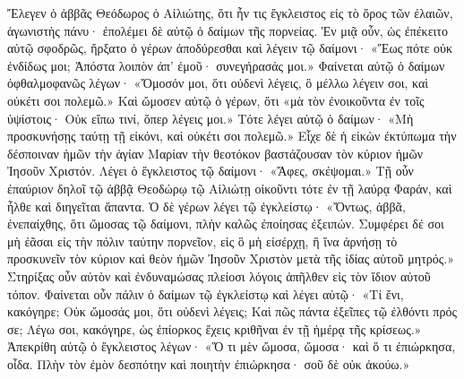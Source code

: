 \documentclass[10pt]{book}
\newcommand{\switchenglish}{\selectlanguage{english} \switchcolumn}
\begin{document}
\begin{paracol}{2}
Ἔλεγεν ὁ ἀββᾶς Θεόδωρος ὁ Αἰλιώτης, ὅτι ἦν τις ἔγκλειστος εἰς τὸ ὄρος τῶν
ἐλαιῶν, ἀγωνιστὴς πάνυ· ἐπολέμει δὲ αὐτῷ ὁ δαίμων τῆς πορνείας. Ἐν μιᾷ οὖν, ὡς
ἐπέκειτο αὐτῷ σφοδρῶς, ἤρξατο ὁ γέρων ἀποδύρεσθαι καὶ λέγειν τῷ δαίμονι· «Ἕως
πότε οὐκ ἐνδίδως μοι; Ἀπόστα λοιπὸν ἀπ’ ἐμοῦ· συνεγήρασάς μοι.» Φαίνεται αὐτῷ
ὁ δαίμων ὀφθαλμοφανῶς λέγων· «Ὄμοσόν μοι, ὅτι οὐδενὶ λέγεις, ὃ μέλλω λέγειν
σοι, καὶ οὐκέτι σοι πολεμῶ.» Καὶ ὤμοσεν αὐτῷ ὁ γέρων, ὅτι «μὰ τὸν ἐνοικοῦντα
ἐν τοῖς ὑψίστοις· Οὐκ εἴπω τινί, ὅπερ λέγεις μοι.» Τότε λέγει αὐτῷ ὁ δαίμων·
«Μὴ προσκυνήσῃς ταύτῃ τῇ εἰκόνι, καὶ οὐκέτι σοι πολεμῶ.» Εἶχε δὲ ἡ εἰκὼν
ἐκτύπωμα τὴν δέσποιναν ἡμῶν τὴν ἁγίαν Μαρίαν τὴν θεοτόκον βαστάζουσαν τὸν
κύριον ἡμῶν Ἰησοῦν Χριστόν. Λέγει ὁ ἔγκλειστος τῷ δαίμονι· «Ἄφες, σκέψομαι.»
Τῇ οὖν ἐπαύριον δηλοῖ τῷ ἀββᾷ Θεοδώρῳ τῷ Αἰλιώτῃ οἰκοῦντι τότε ἐν τῇ λαύρᾳ
Φαράν, καὶ ἦλθε καὶ διηγεῖται ἅπαντα. Ὁ δὲ γέρων λέγει τῷ ἐγκλείστῳ· «Ὄντως,
ἀββᾶ, ἐνεπαίχθης, ὅτι ὤμοσας τῷ δαίμονι, πλὴν καλῶς ἐποίησας ἐξειπών. Συμφέρει
δέ σοι μὴ ἐᾶσαι εἰς τὴν πόλιν ταύτην πορνεῖον, εἰς ὃ μὴ εἰσέρχῃ, ἢ ἵνα ἀρνήσῃ
τὸ προσκυνεῖν τὸν κύριον καὶ θεὸν ἡμῶν Ἰησοῦν Χριστὸν μετὰ τῆς ἰδίας αὐτοῦ
μητρός.» Στηρίξας οὖν αὐτὸν καὶ ἐνδυναμώσας πλείοσι λόγοις ἀπῆλθεν εἰς τὸν
ἴδιον αὐτοῦ τόπον. Φαίνεται οὖν πάλιν ὁ δαίμων τῷ ἐγκλείστῳ καὶ λέγει αὐτῷ·
«Τί ἔνι, κακόγηρε; Οὐκ ὤμοσάς μοι, ὅτι οὐδενὶ λέγεις; Καὶ πῶς πάντα ἐξεῖπες τῷ
ἐλθόντι πρός σε; Λέγω σοι, κακόγηρε, ὡς ἐπίορκος ἔχεις κριθῆναι ἐν τῇ ἡμέρᾳ
τῆς κρίσεως.» Ἀπεκρίθη αὐτῷ ὁ ἔγκλειστος λέγων· «Ὅ τι μὲν ὤμοσα, ὤμοσα· καὶ ὅ
τι ἐπιώρκησα, οἶδα. Πλὴν τὸν ἐμὸν δεσπότην καὶ ποιητὴν ἐπιώρκησα· σοῦ δὲ οὐκ
ἀκούω.»

\switchenglish


\end{paracol}
\end{document}
